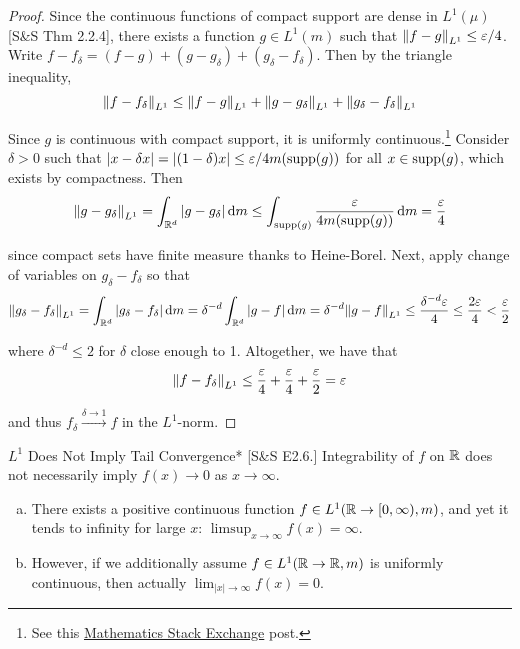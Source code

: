 \begin{proof}
    Since the continuous functions of compact support are dense in \(L^1(\mu)\) [S\&S Thm 2.2.4], there exists a function \(g \in L^1(m)\) such that \(\norm{f - g}_{L^1} \leq \varepsilon / 4\). Write \(f - f_{\delta} = (f-g) + (g-g_{\delta}) + (g_{\delta} - f_{\delta})\). Then by the triangle inequality, 
    \[
    \norm{f - f_{\delta}}_{L^1} \leq \norm{f - g}_{L^1} + \norm{g - g_{\delta}}_{L^1} + \norm{g_{\delta} - f_{\delta}}_{L^1}
    \]

    Since \(g\) is continuous with compact support, it is uniformly continuous.\footnote{See this \href{https://math.stackexchange.com/questions/2086124/continuous-with-compact-support-implies-uniform-continuity}{Mathematics Stack Exchange} post.} Consider \(\delta > 0\) such that \(|x - \delta x| = |(1 - \delta)x| \leq \varepsilon / 4 m(\operatorname{supp}(g))\) for all \(x \in \operatorname{supp}(g)\), which exists by compactness. Then 
    \[
    \norm{g - g_{\delta}}_{L^1} 
    = \int_{\mathbb{R}^d} |g - g_{\delta}| \, \mathrm{d}m
    \leq \int_{\operatorname{supp}(g)} \frac{\varepsilon}{4 m(\operatorname{supp}(g))} \, \mathrm{d}m
    = \frac{\varepsilon}{4}
    \]

    since compact sets have finite measure thanks to Heine-Borel. Next, apply change of variables on \(g_{\delta} - f_{\delta}\) so that  
    \[
    \norm{g_{\delta} - f_{\delta}}_{L^1}
    = \int_{\mathbb{R}^d} |g_{\delta} - f_{\delta}| \, \mathrm{d}m
    = \delta^{-d} \int_{\mathbb{R}^d} |g - f| \, \mathrm{d}m
    = \delta^{-d} \norm{g - f}_{L^1}
    \leq \frac{\delta^{-d} \varepsilon}{4}
    \leq \frac{2\varepsilon}{4}
    < \frac{\varepsilon}{2}
    \]

    where \(\delta^{-d} \leq 2\) for \(\delta\) close enough to 1. Altogether, we have that 
    \[
        \norm{f - f_{\delta}}_{L^1} \leq \frac{\varepsilon}{4} + \frac{\varepsilon}{4} + \frac{\varepsilon}{2}
        = \varepsilon
    \]
    
    and thus \(f_\delta \stackrel{\delta \to 1}{\longrightarrow} f\) in the \(L^1\)-norm. 
\end{proof}

\begin{problem}{\(L^1\) Does Not Imply Tail Convergence}*
    [S\&S E2.6.] Integrability of \(f\) on \(\mathbb{R}\) does not necessarily imply \(f(x) \to 0\) as \(x \to \infty\). 
    \begin{enumerate}[(a)]
        \item There exists a positive continuous function \(f \in L^1(\mathbb{R} \to [0, \infty), m)\), and yet it tends to infinity for large \(x\): \(\limsup_{x \to \infty} f(x) = \infty\). 
        \item However, if we additionally assume \(f \in L^1(\mathbb{R} \to \mathbb{R}, m)\) is uniformly continuous, then actually \(\lim_{|x| \to \infty} f(x) = 0\). 
    \end{enumerate}
\end{problem}


